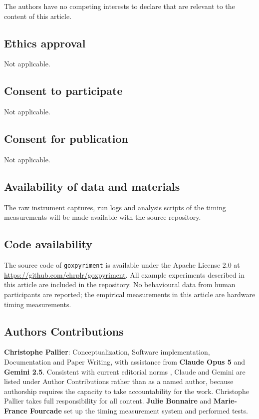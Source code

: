 \documentclass[doc,a4paper,floatsintext]{apa7}
\begin{document}
The authors have no competing interests to declare that are relevant to the content of this article.

\subsection{Ethics approval}

Not applicable.

\subsection{Consent to participate}

Not applicable.

\subsection{Consent for publication}

Not applicable.

\subsection{Availability of data and materials}

The raw instrument captures, run logs and analysis scripts of the timing
measurements will be made available with the source repository.

\subsection{Code availability}

The source code of \texttt{goxpyriment} is available under the Apache
License 2.0 at
\url{https://github.com/chrplr/goxpyriment}. All example experiments
described in this article are included in the repository. No
behavioural data from human participants are reported; the empirical
measurements in this article are hardware timing measurements.

\subsection{Authors Contributions}\label{author-contributions}

\textbf{Christophe Pallier}: Conceptualization, Software
implementation, Documentation and Paper Writing, with assistance from
\textbf{Claude Opus 5} and \textbf{Gemini 2.5}. Consistent with
current editorial norms \parencite{natureportfolio2023,
  springernature2023}, Claude and Gemini are listed under Author
Contributions rather than as a named author, because authorship
requires the capacity to take accountability for the work.  Christophe
Pallier takes full responsibility for all content. \textbf{Julie
  Bonnaire} and \textbf{Marie-France Fourcade} set up the timing
measurement system and performed tests.
\end{document}
